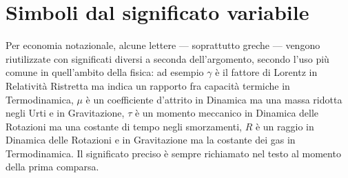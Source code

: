 \section*{Simboli dal significato variabile}

Per economia notazionale, alcune lettere --- soprattutto greche --- vengono riutilizzate con significati diversi a seconda dell'argomento, secondo l'uso più comune in quell'ambito della fisica: ad esempio $\gamma$ è il fattore di Lorentz in Relatività Ristretta ma indica un rapporto fra capacità termiche in Termodinamica, $\mu$ è un coefficiente d'attrito in Dinamica ma una massa ridotta negli Urti e in Gravitazione, $\tau$ è un momento meccanico in Dinamica delle Rotazioni ma una costante di tempo negli smorzamenti, $R$ è un raggio in Dinamica delle Rotazioni e in Gravitazione ma la costante dei gas in Termodinamica. Il significato preciso è sempre richiamato nel testo al momento della prima comparsa.
